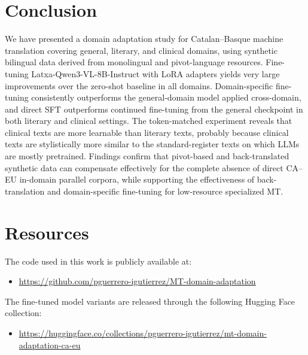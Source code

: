 \documentclass[11pt,a4paper]{article}
\begin{document}
\section{Conclusion}
\label{sec:conclusion}

We have presented a domain adaptation study for Catalan--Basque machine
translation covering general, literary, and clinical domains, using
synthetic bilingual data derived from monolingual and pivot-language
resources. Fine-tuning Latxa-Qwen3-VL-8B-Instruct with
LoRA adapters yields very large improvements over the zero-shot baseline
in all domains. Domain-specific fine-tuning consistently outperforms
the general-domain model applied cross-domain, and direct SFT outperforms
continued fine-tuning from the general checkpoint in both literary and
clinical settings. 
The token-matched experiment reveals that clinical texts are more learnable than literary texts, probably because clinical texts are stylistically more similar to the standard-register texts on which LLMs are mostly pretrained. Findings confirm that
pivot-based and back-translated synthetic data can compensate
effectively for the complete absence of direct CA--EU in-domain
parallel corpora, while \linebreak supporting the effectiveness of back-translation and domain-specific fine-tuning for \linebreak 
low-resource
specialized MT.




\appendix
\section{Resources}
The code used in this work is publicly available at:

\begin{itemize}
  \item \url{https://github.com/pguerrero-igutierrez/MT-domain-adaptation}
\end{itemize}

The fine-tuned model variants are released through the following
Hugging Face collection:

\begin{itemize}
  \item \url{https://huggingface.co/collections/pguerrero-igutierrez/mt-domain-adaptation-ca-eu}
\end{itemize}
\end{document}
